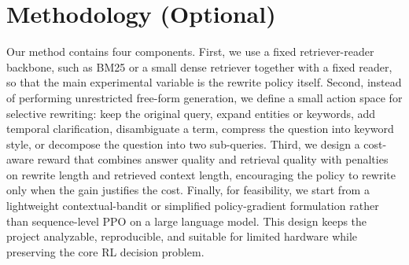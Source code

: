 \section{Methodology (Optional)}
\label{section:algorithm}
Our method contains four components. First, we use a fixed retriever-reader backbone, such as BM25 or a small dense retriever together with a fixed reader, so that the main experimental variable is the rewrite policy itself. Second, instead of performing unrestricted free-form generation, we define a small action space for selective rewriting: keep the original query, expand entities or keywords, add temporal clarification, disambiguate a term, compress the question into keyword style, or decompose the question into two sub-queries. Third, we design a cost-aware reward that combines answer quality and retrieval quality with penalties on rewrite length and retrieved context length, encouraging the policy to rewrite only when the gain justifies the cost. Finally, for feasibility, we start from a lightweight contextual-bandit or simplified policy-gradient formulation rather than sequence-level PPO on a large language model. This design keeps the project analyzable, reproducible, and suitable for limited hardware while preserving the core RL decision problem.
